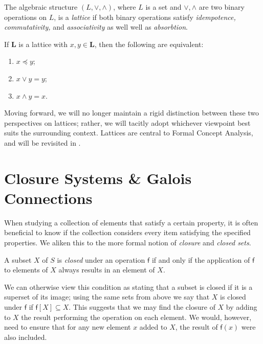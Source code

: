 \begin{definition}
     \label{definition:algebraic-lattice}
The algebraic structure $(L, \vee, \wedge)$, where $L$ is a set and $\vee, \wedge$ are two binary operations on $L$, is a \emph{lattice} if both binary operations satisfy \textit{idempotence, commutativity,} and \textit{associativity} as well well as \textit{absorbtion}.
\end{definition}



\begin{lemma}
  \label{lemma:the-connecting-lemma}
  If $\mathbf{L}$ is a lattice with $x, y \in \mathbf{L}$, then the following are equivalent:
  \begin{enumerate}
      \setlength\itemsep{0pt}
      \setlength\parsep{0pt}
    \item $x \preceq y$;
    \item $x \vee y = y$;
    \item $x \wedge y = x$.
  \end{enumerate}
\end{lemma}

Moving forward, we will no longer maintain a rigid distinction between these two perspectives on lattices; rather, we will tacitly adopt whichever viewpoint best suits the surrounding context. Lattices are central to Formal Concept Analysis, and will be revisited in .

\section{Closure Systems \& Galois Connections}
\label{section:closure-systems}

When studying a collection of elements that satisfy a certain property, it is often beneficial to know if the collection considers every item satisfying the specified properties. We aliken this to the more formal notion of \textit{closure} and \textit{closed sets}.

\begin{definition}
\label{definition:closed-set}
	A subset $X$ of $S$ is \textit{closed} under an operation $\mathsf{f}$ if and only if the application of $\mathsf{f}$ to elements of $X$ always results in an element of $X$.
\end{definition}

We can otherwise view this condition as stating that a subset is closed if it is a superset of its image; using the same sets from above we say that $X$ is closed under $\mathsf{f}$ if $\mathsf{f}[X] \subseteq X$. This suggests that we may find the closure of $X$ by adding to $X$ the result performing the operation on each element. We would, however, need to ensure that for any new element $x$ added to $X$, the result of $\mathsf{f}(x)$ were also included.

